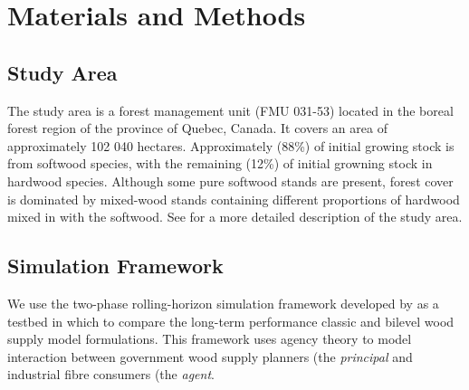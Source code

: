 


\section{Materials and Methods}

\subsection{Study Area}

The study area is a forest management unit (FMU 031-53) located in the boreal forest region of the province of Quebec, Canada. It covers an area of approximately 102 040 hectares. 
Approximately (88\%) of initial growing stock is from softwood species, with the remaining (12\%) of initial growning stock in hardwood species. 
Although some pure softwood stands are present, forest cover is dominated by mixed-wood stands containing different proportions of
hardwood mixed in with the softwood. See \citet{paradis2013risk} for a more detailed description of the study area.

\subsection{Simulation Framework}

We use the two-phase rolling-horizon simulation framework developed by \citet{paradis2013risk} as a testbed in which to compare the long-term performance classic and bilevel wood supply model formulations. This framework uses agency theory to model interaction between government wood supply planners (the \emph{principal} and industrial fibre consumers (the \emph{agent}.

